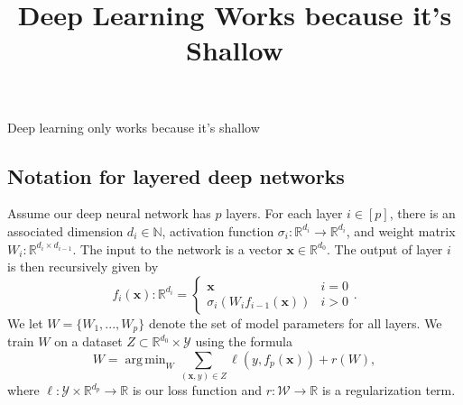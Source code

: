 \documentclass{article}
\title{Deep Learning Works because it's Shallow}
\DeclareMathOperator*{\argmin}{arg\,min}
\newcommand{\N}{\mathbb{N}}
\newcommand{\R}{\mathbb{R}}
\newcommand{\W}{\mathcal{W}}
\newcommand{\Y}{\mathcal{Y}}
\newcommand{\Z}{Z}
\newcommand{\w}{W}
\newcommand{\x}{\mathbf{x}}
\newcommand{\y}{y}
\newcommand{\loss}{\ell}
\newcommand{\reg}{r}
\begin{document}
\begin{center}
    \LARGE
    Deep learning only works because it's shallow
\end{center}


%


\subsection{Notation for layered deep networks}

Assume our deep neural network has $p$ layers.
For each layer $i\in[p]$, there is an associated dimension $d_i\in\N$,
activation function $\sigma_i : \R^{d_i} \to \R^{d_i}$, and
weight matrix $\w_i : \R^{d_i\times d_{i-1}}$.
The input to the network is a vector $\x\in\R^{d_0}$.
The output of layer $i$ is then recursively given by
\begin{equation}
    f_i(\x) : \R^{d_i} = 
    \begin{cases}
        \x & i=0 \\
        \sigma_i(\w_i f_{i-1}(\x)) & i>0 
    \end{cases}
    .
\end{equation}
We let $\w=\{\w_1,...,\w_p\}$ denote the set of model parameters for all layers.
We train $\w$ on a dataset $\Z \subset \R^{d_0}\times\Y$ using the formula
\begin{equation}
    \w = \argmin_{\w} \sum_{(\x,\y)\in\Z}\loss(\y,f_p(\x)) + \reg(\w),
\end{equation}
where $\loss : \Y\times\R^{d_p} \to \R$ is our loss function and $\reg : \W\to\R$ is a regularization term.
\end{document}

